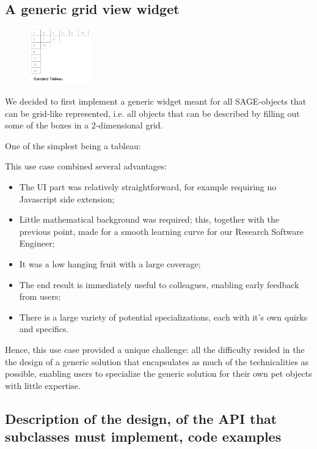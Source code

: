 \documentclass{deliverablereport}
\begin{document}
\subsection{A generic grid view widget}

\begin{figure}
    \begin{center}
      \includegraphics[width=100px]{images/tableauwidget}
\end{center}
\end{figure}

We decided to first implement a generic widget meant for all SAGE-objects that can
be grid-like represented, i.e. all objects that can be described by
filling out some of the boxes in a 2-dimensional grid.

One of the simplest being a tableau:

This use case combined several advantages:
\begin{itemize}
\item The UI part was relatively straightforward, for example
  requiring no Javascript side extension;
\item Little mathematical background was required; this, together with
  the previous point, made for a smooth learning curve for our
  Research Software Engineer;
\item It was a low hanging fruit with a large coverage;
\item The end result is immediately useful to colleagues, enabling
  early feedback from users;
\item There is a large variety of potential specializations, each with
  it's own quirks and specifics.
\end{itemize}
Hence, this use case provided a unique challenge: all the difficulty
resided in the the design of a generic solution that encapsulates as
much of the technicalities as possible, enabling users to specialize
the generic solution for their own pet objects with little expertise.

\subsection{Description of the design, of the API that subclasses must
  implement, code examples}
\end{document}
